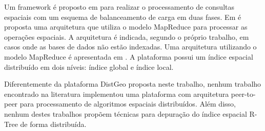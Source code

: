 Um framework é proposto em \cite{xie2008two} para realizar o processamento de consultas
espaciais com um esquema de balanceamento de carga em duas fases.
Em \cite{zhang2009spatial} é proposta uma arquitetura que utiliza o modelo MapReduce para
processar as operações espaciais. A arquitetura é indicada, segundo o próprio
trabalho, em casos onde as bases de dados não estão indexadas.
Uma arquitetura utilizando o modelo MapReduce é
apresentada em \cite{zhong2012towards}. A plataforma possui um índice espacial distribuído em dois níveis: índice global
e índice local.

Diferentemente da plataforma DistGeo proposta neste trabalho, nenhum trabalho encontrado na literatura implementou uma plataforma com arquitetura peer-to-peer para processamento de algoritmos espaciais distribuídos. Além disso, nenhum destes trabalhos propõem técnicas para depuração do índice espacial R-Tree de forma distribuída.